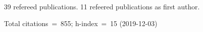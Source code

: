 39 refereed publications. 11 refeered publications as first author.

Total citations~=~855; h-index~=~15 (2019-12-03)